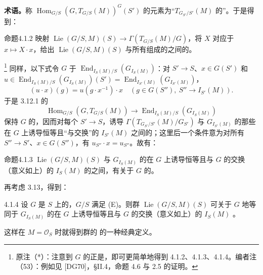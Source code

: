 \textbf{术语。}称 $\operatorname{Hom}_{G/S}(G,T_{G/S}(M))^G(S')$ 的元素为“$T_{G_{S'}/S'}(M)$ 的”。于是得到：
\begin{SGAresult}{命题}{4.1.2}
映射 $\operatorname{Lie}(G/S,M)(S)\to\Gamma(T_{G/S}(M)/G)$，将 $X$ 对应于 $x\mapsto X\cdot x$，给出 $\operatorname{Lie}(G/S,M)(S)$ 与所有组成的之间的。
\end{SGAresult}
\footnote{原注（*）：注意到 $G$ 的正是，即可更简单地得到 4.1.2、4.1.3、4.1.4。编者注（53）：例如见 [DG70]，\S II.4，命题 4.6 与 2.5 的证明。}
同样，以下式令 $G$ 于 $\operatorname{End}_{I_S(M)/S}(G_{I_S(M)})$：对 $S'\to S$、$x\in G(S')$ 和
$u\in\operatorname{End}_{I_S(M)/S}(G_{I_S(M)})(S')=\operatorname{End}_{I_{S'}(M)}(G_{I_{S'}(M)})$，
\[(u\cdot x)(g)=u(g\cdot x^{-1})\cdot x\quad(g\in G(S''),\ S''\to I_{S'}(M)).\]
于是 3.12.1 的
\[\operatorname{Hom}_{G/S}(G,T_{G/S}(M))\to\operatorname{End}_{I_S(M)/S}(G_{I_S(M)})\]
保持 $G$ 的，因而对每个 $S'\to S$，诱导 $\Gamma(T_{G_{S'}/S'}(M)/G_{S'})$ 与 $G_{I_{S'}(M)}$ 的那些在 $G$ 上诱导恒等且“与交换”的 $I_{S'}(M)$ 之间的；这里后一个条件意为对所有 $S''\to S'$、$x\in G(S'')$，有 $u_{S''}\cdot x=u_{S''}$。故有：
\begin{SGAresult}{命题}{4.1.3}
$\operatorname{Lie}(G/S,M)(S)$ 与 $G_{I_S(M)}$ 的在 $G$ 上诱导恒等且与 $G$ 的交换（意义如上）的 $I_S(M)$ 的之间，有关于 $G$ 的。
\end{SGAresult}
再考虑 3.13，得到：
\begin{SGAresult}{}{4.1.4}
设 $G$ 是 $S$ 上的，$G/S$ 满足 (E)。则群 $\operatorname{Lie}(G/S,M)(S)$ 可关于 $G$ 地等同于 $G_{I_S(M)}$ 的在 $G$ 上诱导恒等且与 $G$ 的交换（意义如上）的 $I_S(M)$ 。
\end{SGAresult}
这样在 $M=\mathcal O_S$ 时就得到群的 的一种经典定义。

